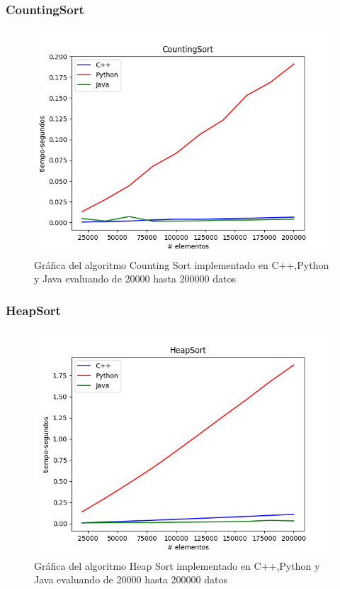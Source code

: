 \subsubsection*{CountingSort}
\begin{figure}[H]
	   \centering
	   \includegraphics[scale=0.5]{Practica01/images/plots/CountingSort.png}
	   \caption{Gráfica del algoritmo Counting Sort implementado en C++,Python y Java evaluando de 20000 hasta 200000 datos}
\end{figure}
\subsubsection*{HeapSort}
\begin{figure}[H]
	   \centering
	   \includegraphics[scale=0.5]{Practica01/images/plots/HeapSort.png}
	   \caption{Gráfica del algoritmo Heap Sort implementado en C++,Python y Java evaluando de 20000 hasta 200000 datos}
\end{figure}
